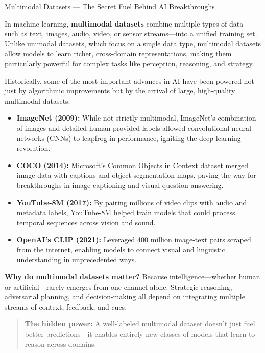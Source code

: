 \begin{HistoricalSidebar}{Multimodal Datasets --- The Secret Fuel Behind AI Breakthroughs}

    In machine learning, \textbf{multimodal datasets} combine multiple types of data—such as text, images, audio, video, or sensor streams—into a unified training set. Unlike unimodal datasets, which focus on a single data type, multimodal datasets allow models to learn richer, cross-domain representations, making them particularly powerful for complex tasks like perception, reasoning, and strategy.
    
    \medskip
    
    Historically, some of the most important advances in AI have been powered not just by algorithmic improvements but by the arrival of large, high-quality multimodal datasets.

    \medskip
    
    \begin{itemize}
    \item \textbf{ImageNet (2009):} While not strictly multimodal, ImageNet’s combination of images and detailed human-provided labels allowed convolutional neural networks (CNNs) to leapfrog in performance, igniting the deep learning revolution.
    \item \textbf{COCO (2014):} Microsoft’s Common Objects in Context dataset merged image data with captions and object segmentation maps, paving the way for breakthroughs in image captioning and visual question answering.
    \item \textbf{YouTube-8M (2017):} By pairing millions of video clips with audio and metadata labels, YouTube-8M helped train models that could process temporal sequences across vision and sound.
    \item \textbf{OpenAI’s CLIP (2021):} Leveraged 400 million image-text pairs scraped from the internet, enabling models to connect visual and linguistic understanding in unprecedented ways.
    \end{itemize}
    
    \medskip
    
    \textbf{Why do multimodal datasets matter?}
    Because intelligence—whether human or artificial—rarely emerges from one channel alone. Strategic reasoning, adversarial planning, and decision-making all depend on integrating multiple streams of context, feedback, and cues.
    
    \medskip
    
    \begin{quote}
    \textbf{The hidden power:} A well-labeled multimodal dataset doesn’t just fuel better predictions—it enables entirely new classes of models that learn to reason across domains.
    \end{quote}
    

\end{HistoricalSidebar}
